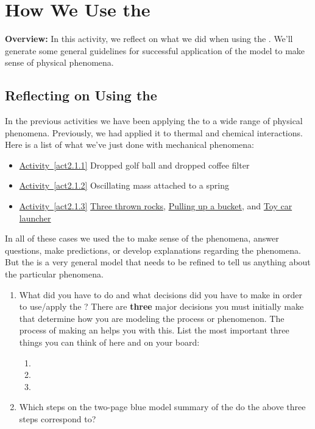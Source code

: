\section{How We Use the \EnergyInteractionModel{}}
\label{act2.1.4}

\begin{overview}
	\textbf{Overview:} In this activity, we reflect on what we did when using the \EnergyInteractionModel{}. We'll generate some general guidelines for successful application of the model to make sense of physical phenomena.
\end{overview}


\subsection{Reflecting on Using the \EnergyInteractionModel{}}

In the previous activities we have been applying the \EnergyInteractionModel{} to a wide range of physical phenomena. Previously, we had applied it to thermal and chemical interactions. Here is a list of what we've just done with mechanical phenomena:

\begin{itemize}
	\item \hyperref[act2.1.1]{Activity~\ref*{act2.1.1}}	Dropped golf ball and dropped coffee filter
	\item \hyperref[act2.1.2]{Activity~\ref*{act2.1.2}}	Oscillating mass attached to a spring
	\item \hyperref[act2.1.3]{Activity~\ref*{act2.1.3}} \hyperref[act2.1.3a]{Three thrown rocks}, \hyperref[act2.1.3b]{Pulling up a bucket}, and \hyperref[act2.1.3c]{Toy car launcher}
\end{itemize}

\noindent In all of these cases we used the \EnergyInteractionModel{} to make sense of the phenomena, answer questions, make predictions, or develop explanations regarding the phenomena. But the \EnergyInteractionModel{} is a very general model that needs to be refined to tell us anything about the particular phenomena.

\begin{enumerate}
	\item What did you have to do and what decisions did you have to make in order to use/apply the \EnergyInteractionModel{}? There are \textbf{three} major decisions you must initially make that determine how you are modeling the process or phenomenon. The process of making an \EnergyDiagram{} helps you with this. List the most important three things you can think of here and on your board:
	\begin{enumerate}
		\item \hrulefill
		\item \hrulefill
		\item \hrulefill
	\end{enumerate}
	
	\item Which steps on the two-page blue model summary of the \EnergyInteractionModel{} do the above three steps correspond to? \hrulefill
\end{enumerate}
	
